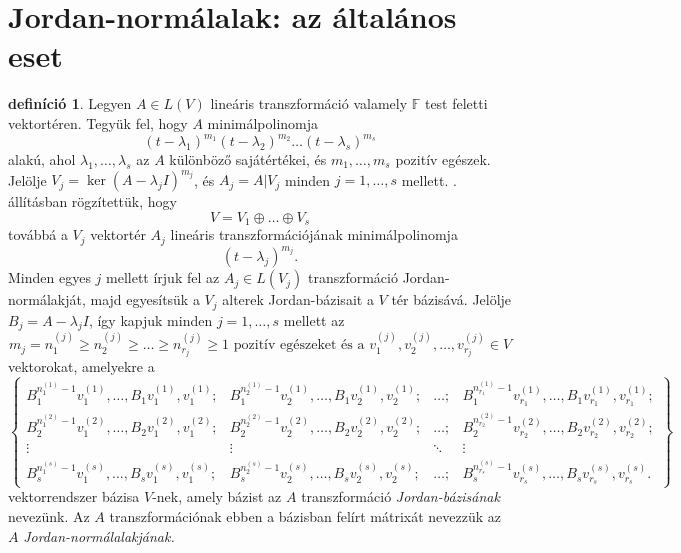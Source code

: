 \documentclass[a4paper, showtrims]{memoir}
\theoremstyle{plain}
\theoremstyle{remark}
\theoremstyle{definition}
\newtheorem{definition}[proposition]{definíció}
\begin{document}
\section{Jordan-normálalak: az általános eset}
\begin{definition}
	Legyen $A\in L\left( V \right)$ lineáris transzformáció valamely $\mathbb{F}$ test
	feletti vektortéren.
	Tegyük fel, hogy $A$ minimálpolinomja
	\[
		\left( t-\lambda_1 \right)^{m_1}\left( t-\lambda_2 \right)^{m_2}\dots\left( t-\lambda_s \right)^{m_s}
	\]
	alakú, ahol $\lambda_1,\ldots,\lambda_s$ az $A$ különböző sajátértékei,
	és $m_1,\ldots,m_s$ pozitív egészek.
	Jelölje $V_j=\ker\left( A-\lambda_j I \right)^{m_j}$,
	és $A_j=A|V_j$ minden $j=1,\ldots,s$ mellett.
    . állításban rögzítettük, hogy
	\[
		V=V_1\oplus\dots\oplus V_s
	\]
	továbbá a $V_j$ vektortér $A_j$ lineáris transzformációjának minimálpolinomja
	\[
		\left( t-\lambda_j \right)^{m_j}.
	\]
	Minden egyes $j$ mellett írjuk fel az $A_j\in L\left( V_j \right)$ transzformáció
	Jordan-normálakját,
	majd egyesítsük a $V_j$ alterek Jordan-bázisait a $V$ tér bázisává.
	Jelölje $B_j=A-\lambda_j I$,
	így kapjuk minden $j=1,\ldots,s$ mellett
	az
	\[
		m_j=n_1^{(j)}\geq n_2^{(j)}\geq\dots\geq n_{r_j}^{(j)}\geq 1
		\text{ pozitív egészeket és a }
		v_1^{(j)},v_2^{(j)},\ldots,v_{r_j}^{(j)}\in V
	\]
	vektorokat, amelyekre a
	\[
		\begin{Bmatrix}
			B_1^{n_1^{(1)}-1}v_1^{(1)},\ldots,B_1v_1^{(1)},v_1^{(1)};
			       &
			B_1^{n_2^{(1)}-1}v_2^{(1)},\ldots,B_1v_2^{(1)},v_2^{(1)};
			       &
			\dots ;
			       &
			B_1^{n_{r_1}^{(1)}-1}v_{r_1}^{(1)},\ldots,B_1v_{r_1}^{(1)},v_{r_1}^{(1)};
			\\
			B_2^{n_1^{(2)}-1}v_1^{(2)},\ldots,B_2v_1^{(2)},v_1^{(2)};
			       &
			B_2^{n_2^{(2)}-1}v_2^{(2)},\ldots,B_2v_2^{(2)},v_2^{(2)};
			       &
			\dots ;
			       &
			B_2^{n_{r_2}^{(2)}-1}v_{r_2}^{(2)},\ldots,B_2v_{r_2}^{(2)},v_{r_2}^{(2)};
			\\
			\vdots & \vdots & \ddots & \vdots
			\\
			B_s^{n_1^{(s)}-1}v_1^{(s)},\ldots,B_sv_1^{(s)},v_1^{(s)};
			       &
			B_s^{n_2^{(s)}-1}v_2^{(s)},\ldots,B_sv_2^{(s)},v_2^{(s)};
			       &
			\dots ;
			       &
			B_s^{n_{r_s}^{(s)}-1}v_{r_s}^{(s)},\ldots,B_sv_{r_s}^{(s)},v_{r_s}^{(s)}.
		\end{Bmatrix}
	\]
	vektorrendszer bázisa $V$-nek, amely bázist az $A$ transzformáció \emph{Jordan-bázisának} nevezünk.
	Az $A$ transzformációnak ebben a bázisban felírt mátrixát nevezzük az $A$ \emph{Jordan-normálalakjának.}
\end{definition}
\end{document}
